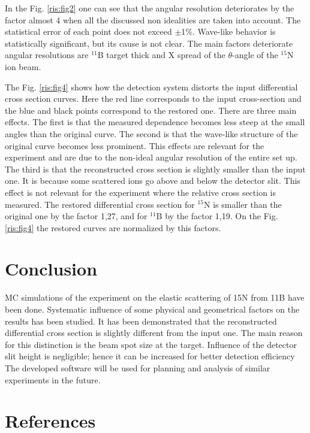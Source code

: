 \documentclass[%
 aip,
cp,  %
 amsmath,amssymb,%
 reprint,%
]{revtex4-2}
\begin{document}
In the Fig. \ref{ris:fig2} one can see that the angular resolution deteriorates by the factor almost 4 when all the discussed non idealities are taken into account. The statistical error of each point does not exceed $\pm$1$\%$. Wave-like behavior is statistically significant, but its cause is not clear. The main factors deteriorate angular resolutions are ${}^{11}$B target thick and X spread of the $\theta$-angle of the ${}^{15}$N ion beam.

The Fig. \ref{ris:fig4} shows how the detection system distorts the input differential cross section curves. Here the red line corresponds to the input cross-section and the blue and black points correspond to the restored one. There are three main effects. The first is that the measured dependence becomes less steep at the small angles than the original curve. The second is that the wave-like structure of the original curve becomes less prominent. This effects are relevant for the experiment and are due to the non-ideal angular resolution of the entire set up.
The third is that the reconstructed cross section is slightly smaller than the input one. It is because some scattered ions go above and below the detector slit. This effect is not relevant for the experiment where the relative cross section is measured. The restored differential cross section for ${}^{15}$N is smaller than the original one by the factor 1,27, and for ${}^{11}$B by the factor 1,19. On the Fig. \ref{ris:fig4} the restored curves are normalized by this factors.

\section{Conclusion}

MC simulations of the experiment on the elastic scattering of 15N from 11B have been done. Systematic influence of some physical and geometrical factors on the results has been studied. It has been demonstrated that the reconstructed differential cross section is slightly different from the input one. The main reason for this distinction is the beam spot size at the target. Influence of the detector slit height is negligible; hence it can be increased for better detection efficiency The developed software will be used for planning and analysis of similar experiments in the future.

\section{References}
\end{document}

